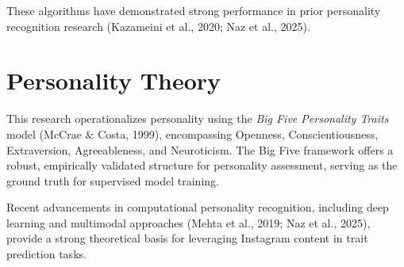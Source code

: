 These algorithms have demonstrated strong performance in prior personality recognition research (Kazameini et al., 2020; Naz et al., 2025).

\section{Personality Theory}

This research operationalizes personality using the \textit{Big Five Personality Traits} model (McCrae \& Costa, 1999), encompassing Openness, Conscientiousness, Extraversion, Agreeableness, and Neuroticism. The Big Five framework offers a robust, empirically validated structure for personality assessment, serving as the ground truth for supervised model training.

Recent advancements in computational personality recognition, including deep learning and multimodal approaches (Mehta et al., 2019; Naz et al., 2025), provide a strong theoretical basis for leveraging Instagram content in trait prediction tasks.